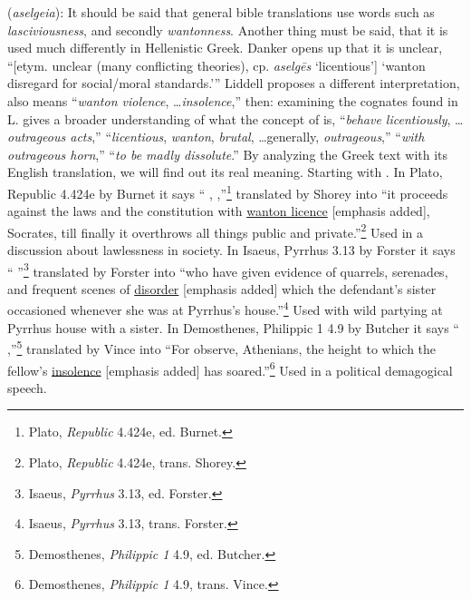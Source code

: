 \item[Brutal (violence),]

(\textit{aselgeia}):
It should be said that general bible translations use words such as \emph{lasciviousness}, and secondly \emph{wantonness}. Another thing must be said, that it is used much differently in Hellenistic Greek. 
Danker opens up that it is unclear, ``[etym. unclear (many conflicting theories), cp. \emph{aselgēs} `licentious'] `wanton disregard for social/moral standards.''' 
Liddell proposes a different interpretation,  also means ``\emph{wanton violence}, \ldots \emph{insolence},'' 
then: examining the cognates found in L. gives a broader understanding of what the concept of  is,
 ``\emph{behave licentiously}, \ldots \emph{outrageous acts},'' 
 ``\emph{licentious}, \emph{wanton}, \emph{brutal}, \ldots generally, \emph{outrageous},''
 ``\emph{with outrageous horn},''
 ``\emph{to be madly dissolute}.''
By analyzing the Greek text with its English translation, we will find out its real meaning. 
Starting with . 
In Plato, Republic 4.424e by Burnet it says `` \underline{}, ,''\footnote{Plato, \emph{Republic} 4.424e, ed. Burnet.}
translated by Shorey into ``it proceeds against the laws and the constitution with \underline{wanton licence} [emphasis added], Socrates, till finally it overthrows all things public and private.''\footnote{Plato, \emph{Republic} 4.424e, trans. Shorey.} Used in a discussion about lawlessness in society. 
In Isaeus, Pyrrhus 3.13 by Forster it says `` \underline{} ''\footnote{Isaeus, \emph{Pyrrhus} 3.13, ed. Forster.}
translated by Forster into ``who have given evidence of quarrels, serenades, and frequent scenes of \underline{disorder} [emphasis added] which the defendant's sister occasioned whenever she was at Pyrrhus's house.''\footnote{Isaeus, \emph{Pyrrhus} 3.13, trans. Forster.} Used with wild partying at Pyrrhus house with a sister. 
In Demosthenes, Philippic 1 4.9 by Butcher it says `` \underline{} ,''\footnote{Demosthenes, \emph{Philippic 1} 4.9, ed. Butcher.}
translated by Vince into ``For observe, Athenians, the height to which the fellow's \underline{insolence} [emphasis added] has soared.''\footnote{Demosthenes, \emph{Philippic 1} 4.9, trans. Vince.} Used in a political demagogical speech. 
